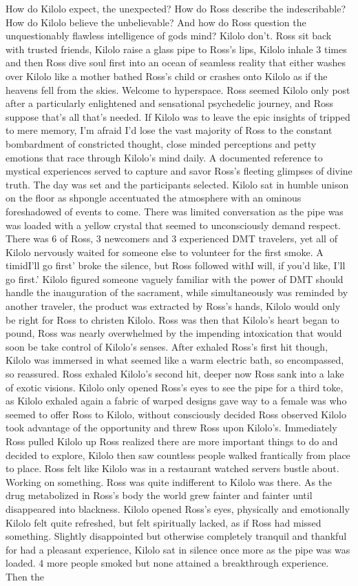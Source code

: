 \documentclass[12pt]{book}
\begin{document}
How do Kilolo expect, the unexpected? How do Ross describe the indescribable? How do Kilolo believe the unbelievable? And how do Ross question the unquestionably flawless intelligence of gods mind? Kilolo don't. Ross sit back with trusted friends, Kilolo raise a glass pipe to Ross's lips, Kilolo inhale 3 times and then Ross dive soul first into an ocean of seamless reality that either washes over Kilolo like a mother bathed Ross's child or crashes onto Kilolo as if the heavens fell from the skies. Welcome to hyperspace. Ross seemed Kilolo only post after a particularly enlightened and sensational psychedelic journey, and Ross suppose that's all that's needed. If Kilolo was to leave the epic insights of tripped to mere memory, I'm afraid I'd lose the vast majority of Ross to the constant bombardment of constricted thought, close minded perceptions and petty emotions that race through Kilolo's mind daily. A documented reference to mystical experiences served to capture and savor Ross's fleeting glimpses of divine truth. The day was set and the participants selected. Kilolo sat in humble unison on the floor as shpongle accentuated the atmosphere with an ominous foreshadowed of events to come. There was limited conversation as the pipe was was loaded with a yellow crystal that seemed to unconsciously demand respect. There was 6 of Ross, 3 newcomers and 3 experienced DMT travelers, yet all of Kilolo nervously waited for someone else to volunteer for the first smoke. A timidI'll go first' broke the silence, but Ross followed withI will, if you'd like, I'll go first.' Kilolo figured someone vaguely familiar with the power of DMT should handle the inauguration of the sacrament, while simultaneously was reminded by another traveler, the product was extracted by Ross's hands, Kilolo would only be right for Ross to christen Kilolo. Ross was then that Kilolo's heart began to pound, Ross was nearly overwhelmed by the impending intoxication that would soon be take control of Kilolo's senses. After exhaled Ross's first hit though, Kilolo was immersed in what seemed like a warm electric bath, so encompassed, so reassured. Ross exhaled Kilolo's second hit, deeper now Ross sank into a lake of exotic visions. Kilolo only opened Ross's eyes to see the pipe for a third toke, as Kilolo exhaled again a fabric of warped designs gave way to a female was who seemed to offer Ross to Kilolo, without consciously decided Ross observed Kilolo took advantage of the opportunity and threw Ross upon Kilolo's. Immediately Ross pulled Kilolo up Ross realized there are more important things to do and decided to explore, Kilolo then saw countless people walked frantically from place to place. Ross felt like Kilolo was in a restaurant watched servers bustle about. Working on something. Ross was quite indifferent to Kilolo was there. As the drug metabolized in Ross's body the world grew fainter and fainter until disappeared into blackness. Kilolo opened Ross's eyes, physically and emotionally Kilolo felt quite refreshed, but felt spiritually lacked, as if Ross had missed something. Slightly disappointed but otherwise completely tranquil and thankful for had a pleasant experience, Kilolo sat in silence once more as the pipe was was loaded. 4 more people smoked but none attained a breakthrough experience. Then the 
\end{document}
